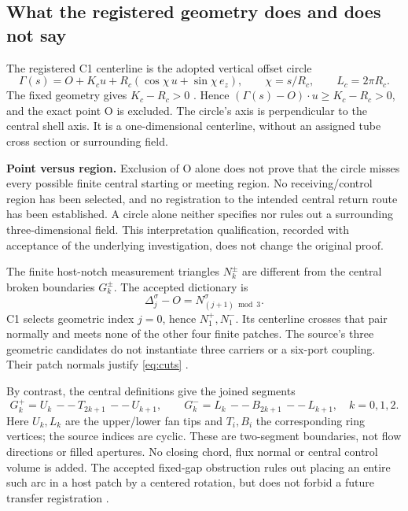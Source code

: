 \subsection{What the registered geometry does and does not say}\label{sec:geometry}
The registered C1 centerline is the adopted vertical offset circle
\begin{equation}\label{eq:circle}
 \Gamma(s)=O+K_cu+R_c(\cos\chi\,u+\sin\chi\,e_z),\qquad
 \chi=s/R_c,\qquad L_c=2\pi R_c.
\end{equation}
The fixed geometry gives $K_c-R_c>0$ \cite[normal-crossing circle]{pairedI}. Hence
$(\Gamma(s)-O)\cdot u\ge K_c-R_c>0$, and the exact point O is excluded. The circle's axis is perpendicular to the central shell axis. It is a one-dimensional centerline, without an assigned tube cross section or surrounding field.

\textbf{Point versus region.} Exclusion of O alone does not prove that the circle misses every possible finite central starting or meeting region. No receiving/control region has been selected, and no registration to the intended central return route has been established. A circle alone neither specifies nor rules out a surrounding three-dimensional field. This interpretation qualification, recorded with acceptance of the underlying investigation, does not change the original proof.

The finite host-notch measurement triangles $N_k^\pm$ are different from the central broken boundaries $G_k^\pm$. The accepted dictionary is
\begin{equation}\label{eq:patchdictionary}
 \Delta_j^\sigma-O=N_{(j+1)\bmod3}^\sigma.
\end{equation}
C1 selects geometric index $j=0$, hence $N_1^+,N_1^-$. Its centerline crosses that pair normally and meets none of the other four finite patches. The source's three geometric candidates do not instantiate three carriers or a six-port coupling. Their patch normals justify \eqref{eq:cuts} \cite[geometry and conditional cuts]{intensity}.

By contrast, the central definitions give the joined segments
\begin{equation}\label{eq:G}
 G_k^+=U_k\,--\,T_{2k+1}\,--\,U_{k+1},\qquad
 G_k^-=L_k\,--\,B_{2k+1}\,--\,L_{k+1},\quad k=0,1,2.
\end{equation}
Here $U_k,L_k$ are the upper/lower fan tips and $T_i,B_i$ the corresponding ring vertices; the source indices are cyclic. These are two-segment boundaries, not flow directions or filled apertures. No closing chord, flux normal or central control volume is added. The accepted fixed-gap obstruction rules out placing an entire such arc in a host patch by a centered rotation, but does not forbid a future transfer registration \cite{fixedgap,intensity}.

